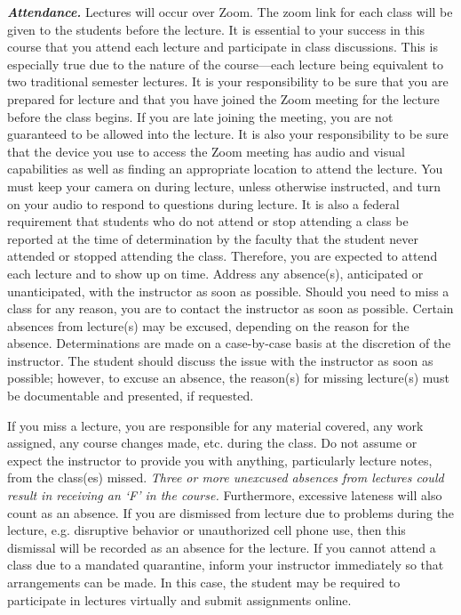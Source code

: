 \documentclass[11pt,letterpaper]{article}
\begin{document}
{\itshape\bfseries\color{stacred}Attendance.} Lectures will occur over Zoom. The zoom link for each class will be given to the students before the lecture. It is essential to your success in this course that you attend each lecture and participate in class discussions. This is especially true due to the nature of the course---each lecture being equivalent to two traditional semester lectures. It is your responsibility to be sure that you are prepared for lecture and that you have joined the Zoom meeting for the lecture before the class begins. If you are late joining the meeting, you are not guaranteed to be allowed into the lecture. It is also your responsibility to be sure that the device you use to access the Zoom meeting has audio and visual capabilities as well as finding an appropriate location to attend the lecture. You must keep your camera on during lecture, unless otherwise instructed, and turn on your audio to respond to questions during lecture. It is also a federal requirement that students who do not attend or stop attending a class be reported at the time of determination by the faculty that the student never attended or stopped attending the class. Therefore, you are expected to attend each lecture and to show up on time. Address any absence(s), anticipated or unanticipated, with the instructor as soon as possible. Should you need to miss a class for any reason, you are to contact the instructor as soon as possible. Certain absences from lecture(s) may be excused, depending on the reason for the absence. Determinations are made on a case-by-case basis at the discretion of the instructor. The student should discuss the issue with the instructor as soon as possible; however, to excuse an absence, the reason(s) for missing lecture(s) must be documentable and presented, if requested. \pspace

If you miss a lecture, you are responsible for any material covered, any work assigned, any course changes made, etc. during the class. Do not assume or expect the instructor to provide you with anything, particularly lecture notes, from the class(es) missed. {\itshape Three or more unexcused absences from lectures could result in receiving an `F' in the course.} Furthermore, excessive lateness will also count as an absence. If you are dismissed from lecture due to problems during the lecture, e.g. disruptive behavior or unauthorized cell phone use, then this dismissal will be recorded as an absence for the lecture. If you cannot attend a class due to a mandated quarantine, inform your instructor immediately so that arrangements can be made. In this case, the student may be required to participate in lectures virtually and submit assignments online. \pspace
\end{document}
